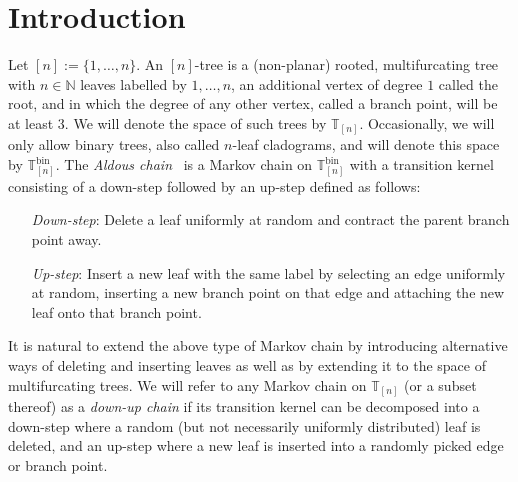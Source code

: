 \documentclass[a4paper, final]{amsart}
\theoremstyle{plain}
\theoremstyle{definition}
\newcommand{\T}{\mathbb{T}}
\DeclareMathOperator{\bin}{bin}
\newcommand{\nin}{{n \in \mathbb{N}}}
\begin{document}
\section{Introduction}\label{sec:introduction}
Let $[n] := \{1, \ldots, n\}$.
An $[n]$-tree is a (non-planar) rooted, multifurcating tree with $\nin$ leaves labelled by $1, \ldots, n$, an additional vertex of degree $1$ called the root, and in which the degree of any other vertex, called a branch point, will be at least $3$.
We will denote the space of such trees by $\T_{[n]}$.
Occasionally, we will only allow binary trees, also called $n$-leaf cladograms, and will denote this space by $\T_{[n]}^{\bin}$.
The \textit{Aldous chain}~\cite{RefWorks:doc:5b4cbc14e4b04428cc72cf41,RefWorks:doc:5b4cbc43e4b0185a9132aee9} is a Markov chain on $\T_{[n]}^{\bin}$ with a transition kernel consisting of a down-step followed by an up-step defined as follows:
%
\begin{itemize}[leftmargin=1in]
  \item[\textit{Down-step}:] Delete a leaf uniformly at random and contract the parent branch point away.
  \item[\textit{Up-step}:] Insert a new leaf with the same label by selecting an edge uniformly at random, inserting a new branch point on that edge and attaching the new leaf onto that branch point.
\end{itemize}
%
It is natural to extend the above type of Markov chain by introducing alternative ways of deleting and inserting leaves as well as by extending it to the space of multifurcating trees.
We will refer to any Markov chain on $\T_{[n]}$ (or a subset thereof) as a \textit{down-up chain} if its transition kernel can be decomposed into a down-step where a random (but not necessarily uniformly distributed) leaf is deleted, and an up-step where a new leaf is inserted into a randomly picked edge or branch point.
\end{document}
